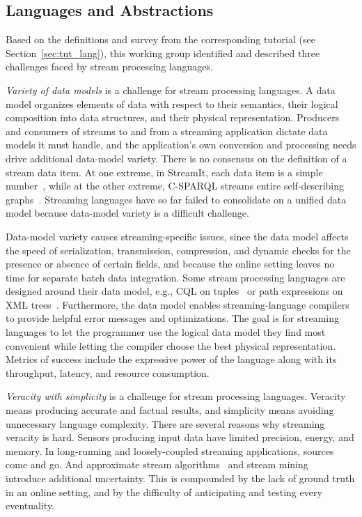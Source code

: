\subsection{Languages and Abstractions}\label{sec:wg_lang}

Based on the definitions and survey from the corresponding tutorial
(see Section~\ref{sec:tut_lang}), this working group identified and
described three challenges faced by stream processing languages.

\emph{Variety of data models} is a challenge for stream processing
languages. A data model organizes elements of data with respect to
their semantics, their logical composition into data structures, and
their physical representation. Producers and consumers of streams to
and from a streaming application dictate data models it must handle,
and the application's own conversion and processing needs drive
additional data-model variety.  There is no consensus on the definition of a stream
data item. At one extreme, in \textsf{StreamIt}, each data item is a simple
number~\cite{thies_et_al_2002}, while at the other extreme, \textsf{C-SPARQL}
streams entire self-describing graphs~\cite{barbieri_et_al_2009}.
Streaming languages have so far failed to consolidate on a unified data model
because data-model variety is a difficult challenge.

Data-model variety causes streaming-specific issues, since the data
model affects the speed of serialization, transmission, compression,
and dynamic checks for the presence or absence of certain fields, and
because the online setting leaves no time for separate batch data
integration. Some stream processing languages are designed around
their data model, e.g., CQL on tuples~\cite{arasu_babu_widom_2006} or
path expressions on XML trees~\cite{diao_et_al_2002}. Furthermore, the
data model enables streaming-language compilers to provide helpful
error messages and optimizations. The goal is for streaming languages to let the programmer use the
logical data model they find most convenient while letting the
compiler choose the best physical representation. Metrics of success
include the expressive power of the language along with its throughput,
latency, and resource consumption.

\emph{Veracity with simplicity} is a challenge for stream processing
languages. Veracity means producing accurate and factual results, and
simplicity means avoiding unnecessary language complexity. There are
several reasons why streaming veracity is hard. Sensors producing
input data have limited precision, energy, and memory. In
long-running and loosely-coupled streaming applications,
sources come and go. And approximate stream
algorithms~\cite{babcock_et_al_2002} and stream
mining~\cite{gaber_zaslavsky_krishnaswamy_2005} introduce additional
uncertainty. This is compounded by the lack of ground truth in an
online setting, and by the difficulty of anticipating and testing
every eventuality.

